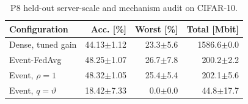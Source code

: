 \begin{table}[t]
\centering
\footnotesize
\caption{P8 held-out server-scale and mechanism audit on CIFAR-10.}
\label{tab:p8-audit}
\begin{tabular}{lrrr}
\toprule
Configuration & Acc. [\%] & Worst [\%] & Total [Mbit]\\
\midrule
Dense, tuned gain & 44.13$\pm$1.12 & 23.3$\pm$5.6 & 1586.6$\pm$0.0\\
Event-FedAvg & 48.25$\pm$1.07 & 26.7$\pm$7.8 & 200.2$\pm$2.2\\
Event, $\rho=1$ & 48.32$\pm$1.05 & 25.4$\pm$5.4 & 202.1$\pm$5.6\\
Event, $q=\vartheta$ & 18.42$\pm$7.33 & 0.0$\pm$0.0 & 44.8$\pm$17.7\\
\bottomrule
\end{tabular}
\end{table}
